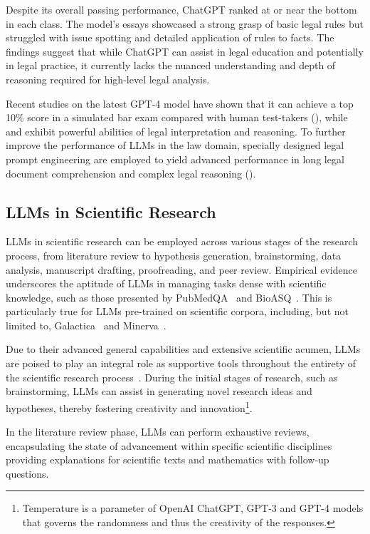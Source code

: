 Despite its overall passing performance, ChatGPT ranked at or near the bottom in each class.
The model's essays showcased a strong grasp of basic legal rules but struggled with issue spotting and detailed application of rules to facts.
The findings suggest that while ChatGPT can assist in legal education and potentially in legal practice, it currently lacks the nuanced understanding and depth of reasoning required for high-level legal analysis.

Recent studies on the latest GPT-4 model have shown that it can achieve a top 10\% score in a simulated bar exam compared with human test-takers (\textcite{gpt4}), while \textcite{nay2022lawinformscode} and exhibit powerful abilities of legal interpretation and reasoning.
To further improve the performance of LLMs in the law domain, specially designed legal prompt engineering are employed to yield advanced performance in long legal document comprehension and complex legal reasoning (\textcite{survey}).


\subsection{LLMs in Scientific Research}
\label{subsec:llms-in-scientific-research}

LLMs in scientific research can be employed across various stages of the research process, from literature review to hypothesis generation, brainstorming, data analysis, manuscript drafting, proofreading, and peer review.
Empirical evidence underscores the aptitude of LLMs in managing tasks dense with scientific knowledge, such as those presented by PubMedQA~\cite{jin2019pubmedqa} and BioASQ~\cite{krithara2022bioasq}.
This is particularly true for LLMs pre-trained on scientific corpora, including, but not limited to, Galactica~\cite{taylor2022galactica} and Minerva~\cite{lewkowycz2022minerva}.

Due to their advanced general capabilities and extensive scientific acumen, LLMs are poised to play an integral role as supportive tools throughout the entirety of the scientific research process~\cite{zhang2023smallstep}.
During the initial stages of research, such as brainstorming, LLMs can assist in generating novel research ideas and hypotheses, thereby fostering creativity and innovation\footnote{Temperature is a parameter of OpenAI ChatGPT, GPT-3 and GPT-4 models that governs the randomness and thus the creativity of the responses.}.

In the literature review phase, LLMs can perform exhaustive reviews, encapsulating the state of advancement within specific scientific disciplines~\cite{haman2023usingchatgpt, aydin2022openaichatgpt} providing explanations for scientific texts and mathematics with follow-up questions.

